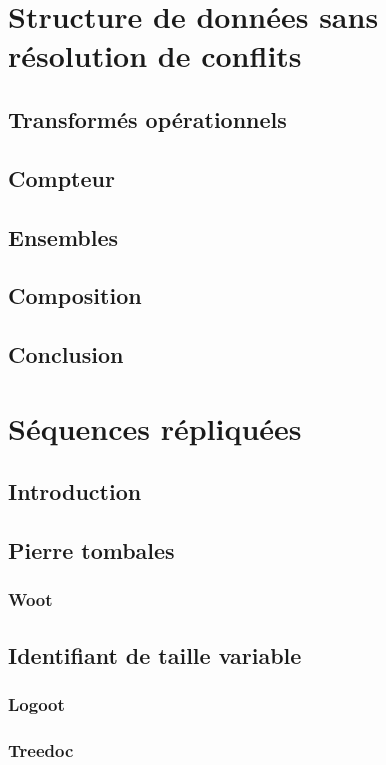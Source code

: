 \chapter{Structure de données sans résolution de conflits}
\section{Transformés opérationnels}
\section{Compteur}
\section{Ensembles}
\section{Composition}
\section{Conclusion}

\chapter{Séquences répliquées}
\section{Introduction}
\section{Pierre tombales}
\subsection{Woot}
\section{Identifiant de taille variable}
\subsection{Logoot}
\subsection{Treedoc}

